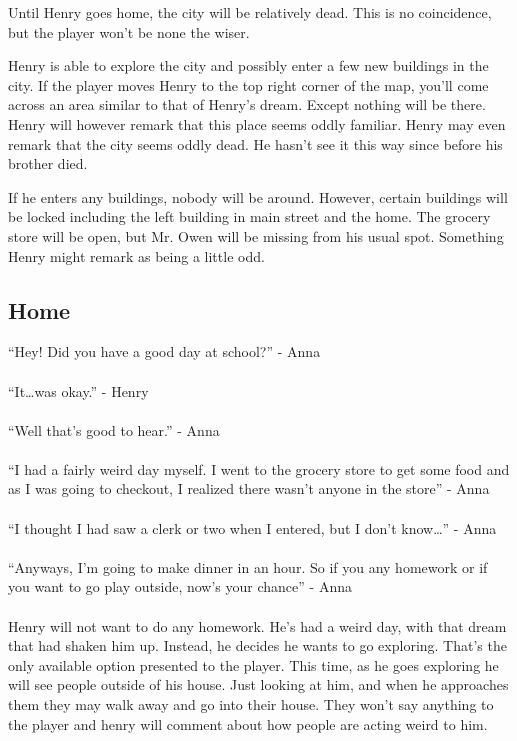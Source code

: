 \documentclass[12pt, a4paper, titlepage]{article}
\begin{document}
        Until Henry goes home, the city will be relatively dead. This is no coincidence, but the player won't be none the wiser.
        
        Henry is able to explore the city and possibly enter a few new buildings in the city. If the player moves Henry to the top right corner of the map, you'll come across an area similar
        to that of Henry's dream. Except nothing will be there. Henry will however remark that this place seems oddly familiar. Henry may even remark that the city seems oddly dead. He 
        hasn't see it this way since before his brother died.
        
        If he enters any buildings, nobody will be around. However, certain buildings will be locked including the left building in main street and the home. The grocery store will be open, but Mr. Owen will be missing from his usual spot. Something Henry might remark as being a little odd.

        \subsection{Home}

            ``Hey! Did you have a good day at school?'' - Anna\\~\\
            ``It\dots was okay.'' - Henry\\~\\
            ``Well that's good to hear.'' - Anna\\~\\
            ``I had a fairly weird day myself. I went to the grocery store to get some food and as I was going to checkout, I realized there wasn't anyone in the store'' - Anna\\~\\
            ``I thought I had saw a clerk or two when I entered, but I don't know\ldots'' - Anna\\~\\
            ``Anyways, I'm going to make dinner in an hour. So if you any homework or if you want to go play outside, now's your chance'' - Anna\\~\\

            Henry will not want to do any homework. He's had a weird day, with that dream that had shaken him up. Instead, he decides he wants to go exploring. That's the only available 		   option presented to the player. This time, as he goes exploring he will see people outside of his house. Just looking at him, and when he approaches them they may walk away 		   and go into their house. They won't say anything to the player and henry will comment about how people are acting weird to him.
            
\end{document}

